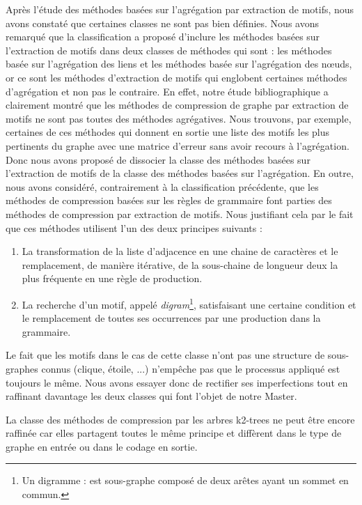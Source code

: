 Après l'étude des méthodes basées sur l'agrégation par extraction de motifs, nous avons constaté que certaines classes ne sont pas bien définies. Nous avons remarqué que la classification a proposé d'inclure les méthodes basées sur l'extraction de motifs dans deux classes de méthodes qui sont : les méthodes basée sur l'agrégation des liens et les méthodes  basée sur l'agrégation des nœuds, or ce sont les méthodes d'extraction de motifs qui englobent certaines méthodes d'agrégation et non pas le contraire. En effet, notre étude bibliographique a clairement montré que les méthodes de compression de graphe par extraction de motifs ne sont pas toutes des méthodes agrégatives. Nous trouvons, par exemple, certaines de ces méthodes qui donnent en sortie une liste des motifs les plus pertinents du graphe avec une matrice d'erreur sans avoir recours à l'agrégation. Donc nous avons proposé de dissocier la classe des méthodes basées sur l'extraction de motifs de la classe des méthodes basées sur l'agrégation.
En outre, nous avons considéré, contrairement à la classification précédente, que les méthodes de compression basées sur les règles de grammaire font parties des méthodes de compression par extraction de motifs. Nous justifiant cela par le fait que ces méthodes utilisent l'un des deux principes suivants : 
\begin{enumerate}
\item La transformation de la liste d'adjacence en une chaine de caractères et le remplacement, de manière itérative, de la sous-chaine de longueur deux la plus fréquente en une règle de production.
\item La recherche d'un motif, appelé \textit{digram}\footnote{Un digramme : est sous-graphe composé de deux arêtes ayant un sommet en commun.}, satisfaisant une certaine condition et le remplacement de toutes ses occurrences par une production dans la grammaire. 
\end{enumerate}
Le fait que les motifs dans le cas de cette classe n'ont pas une structure de sous-graphes connus (clique, étoile, ...) n'empêche pas que le processus appliqué est toujours le même. Nous avons essayer donc de rectifier ses imperfections tout en raffinant davantage les deux classes qui font l'objet de notre Master. 

La classe des méthodes de compression par les arbres k2-trees ne peut être encore raffinée car elles partagent toutes le même principe et diffèrent dans le type de graphe en entrée ou dans le codage en sortie.

